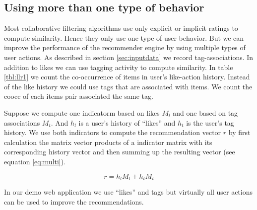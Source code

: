 \subsection{Using more than one type of behavior}
\label{sec:multimodal}

Most collaborative filtering algorithms use only explicit or implicit ratings to compute similarity. Hence they only use one type of user behavior.
But we can improve the performance of the recommender engine by using multiple types of user actions. As described in section \ref{sec:inputdata} we record tag-associations. In addition to likes we can use tagging activity to compute similarity. In table \ref{tbl:llr1} we count the co-occurrence of items in user's like-action history. Instead of the like history we could use tags that are associated with items. We count the \gls{coocc} of each items pair associated the same tag.

Suppose we compute one \gls{indicatorm} based on likes $M_l$ and one based on tag associations $M_t$. And $h_l$ is a user's history of ``likes'' and $h_t$ is the user's tag history. We use both indicators to compute the recommendation vector $r$ by first calculation the matrix vector products of a indicator matrix with its corresponding history vector and then summing up the resulting vector (see equation \ref{eq:multi}).

\begin{equation}
  \label{eq:multi}
  r = h_l M_l + h_t M_t
\end{equation}

In our demo web application we use ``likes'' and tags but virtually all user actions can be used to improve the recommendations.
